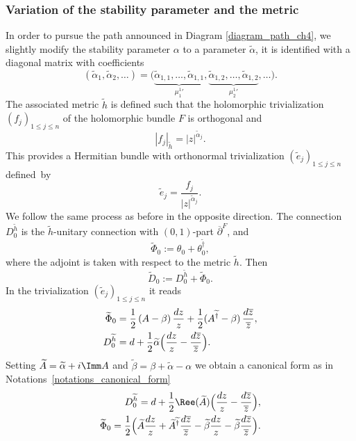 \subsubsection{Variation of the stability parameter and the metric}\label{subsect_local_variation_metric}
In order to pursue the path announced in Diagram \eqref{diagram_path_ch4}, we slightly modify the stability parameter $\alpha$ to a parameter $\widetilde{\alpha}$, it is identified with a diagonal matrix with coefficients
\[
(\widetilde{\alpha}_1,\widetilde{\alpha}_2,\dots)=\bigl(\underbrace{\widetilde{\alpha}_{1,1},\dots, \widetilde{\alpha}_{1,1}}_{{\mu^1_1}' }, \underbrace{\widetilde{\alpha}_{1,2},\dots, \widetilde{\alpha}_{1,2}}_{ {\mu^1_2}'}, \dots \bigr).
\]
The associated metric $\widetilde{h}$ is defined such that the holomorphic trivialization $(f_j)_{1\le j\le n}$ of the holomorphic bundle $F$ is orthogonal and
\[
|f_j|_{\widetilde{h}} =|z|^{\widetilde{\alpha}_j}.
\]
This provides a Hermitian bundle with orthonormal trivialization $(\widetilde{e}_j)_{1\le j\le n}$ defined~by
\[
\widetilde{e}_j = \frac{f_j}{|z|^{\widetilde{\alpha}_j}}.
\]
We follow the same process as before in the opposite direction. The connection $D_0^{\widetilde{h}}$ is the $\widetilde{h}$-unitary connection with $(0,1)$-part $\overline{\partial}^F$, and
\[
\widetilde{\Phi}_0 := \theta_0 + \theta_0^{\widetilde{\dagger}},
\]
where the adjoint is taken with respect to the metric $\widetilde{h}$. Then
\[
\widetilde{D}_0 := D_0^{\widetilde{h}} + \widetilde{\Phi}_0.
\]
In the trivialization $(\widetilde{e}_j)_{1\le j\le n}$ it reads
\begin{align*}
\widetilde{\Phi}_0 &= \frac{1}{2}\left(A-\beta\right)\frac{d z}{z} + \frac{1}{2}(A^{\widetilde{\dagger}}-\beta)\,\frac{d \overline{z}}{\overline{z}}, \\
D_0^{\widetilde{h}} &= d + \frac{1}{2}\widetilde{\alpha} \Bigl(\frac{d z}{z}-\frac{d\overline{z}}{\overline{z}}\Bigr).
\end{align*}
Setting $\widetilde{A}= \widetilde{\alpha}+i \Imm A$ and $\widetilde{\beta}= \beta + \widetilde{\alpha} - \alpha$ we obtain a canonical form as in Notations~\ref{notations_canonical_form}
\begin{align*}
D_0^{\widetilde{h}}= d + \frac{1}{2}\Ree(\widetilde{A})\Bigl(\frac{d z}{z}-\frac{d \overline{z}}{\overline{z}}\Bigr), \\
\widetilde{\Phi}_0 = \frac{1}{2}\Bigl(\widetilde{A}\frac{d z}{z} + \widetilde{A}^{\widetilde{\dagger}}\frac{d\overline{z}}{\overline{z}} - \widetilde{\beta} \frac{d z}{z} - \widetilde{\beta} \frac{d \overline{z}}{\overline{z}}\Bigr).
\end{align*}
